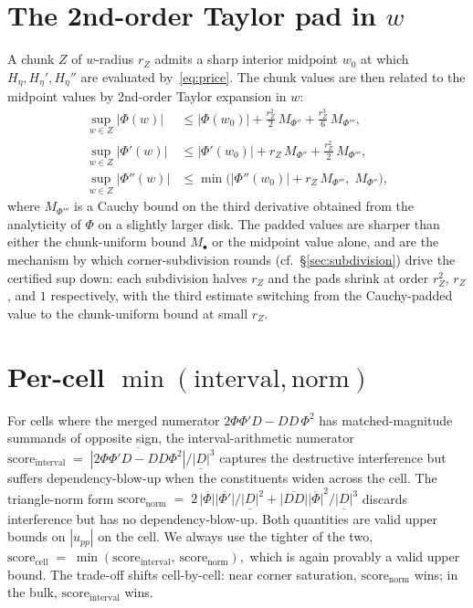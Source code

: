 \documentclass[11pt]{article}
\theoremstyle{definition}
\newcommand{\Heta}{H_{\eta}}
\newcommand{\HetaP}{H_{\eta}'}
\newcommand{\HetaPP}{H_{\eta}''}
\newcommand{\abslb}[1]{\underline{|#1|}}
\newcommand{\absub}[1]{\overline{|#1|}}
\begin{document}
\section{The 2nd-order Taylor pad in $w$}\label{sec:taylor-pad}

A chunk $Z$ of $w$-radius $r_Z$ admits a sharp interior midpoint $w_0$ at which
$\Heta, \HetaP, \HetaPP$ are evaluated by~\eqref{eq:price}. The chunk values are then
related to the midpoint values by 2nd-order Taylor expansion in $w$:
\begin{equation}\label{eq:taylor-pad}
\begin{aligned}
   \sup_{w\in Z}|\Phi(w)| &\le |\Phi(w_0)| + \tfrac{r_Z^2}{2}\,M_{\Phi''} + \tfrac{r_Z^3}{6}\,M_{\Phi'''}, \\
   \sup_{w\in Z}|\Phi'(w)| &\le |\Phi'(w_0)| + r_Z\,M_{\Phi''} + \tfrac{r_Z^2}{2}\,M_{\Phi'''}, \\
   \sup_{w\in Z}|\Phi''(w)| &\le \min\bigl(|\Phi''(w_0)| + r_Z\,M_{\Phi'''},\;M_{\Phi''}\bigr),
\end{aligned}
\end{equation}
where $M_{\Phi'''}$ is a Cauchy bound on the third derivative obtained from the
analyticity of $\Phi$ on a slightly larger disk. The padded values are sharper than
either the chunk-uniform bound $M_{\bullet}$ or the midpoint value alone, and are the
mechanism by which corner-subdivision rounds (cf.\ \S\ref{sec:subdivision}) drive the
certified sup down: each subdivision halves $r_Z$ and the pads shrink at order
$r_Z^2$, $r_Z$, and $1$ respectively, with the third estimate switching from the
Cauchy-padded value to the chunk-uniform bound at small $r_Z$.

\bigskip

\section{Per-cell $\min(\text{interval},\text{norm})$}\label{sec:min-cell}

For cells where the merged numerator $2\Phi\Phi'D - DD\,\Phi^2$ has matched-magnitude
summands of opposite sign, the interval-arithmetic numerator
\(
   \mathrm{score}_{\mathrm{interval}}
   \;=\;
   \absub{2\Phi\Phi'D - DD\Phi^2}\big/\abslb{D}^3
\)
captures the destructive interference but suffers dependency-blow-up when the
constituents widen across the cell. The triangle-norm form
\(
   \mathrm{score}_{\mathrm{norm}}
   \;=\;
   2\,\absub{\Phi}\absub{\Phi'}/\abslb{D}^2 + \absub{DD}\absub{\Phi}^2/\abslb{D}^3
\)
discards interference but has no dependency-blow-up. Both quantities are valid upper
bounds on $|u_{pp}|$ on the cell. We always use the tighter of the two,
\(
   \mathrm{score}_{\mathrm{cell}}
   \;=\;
   \min(\mathrm{score}_{\mathrm{interval}},\ \mathrm{score}_{\mathrm{norm}}),
\)
which is again provably a valid upper bound. The trade-off shifts cell-by-cell:
near corner saturation, $\mathrm{score}_{\mathrm{norm}}$ wins; in the bulk,
$\mathrm{score}_{\mathrm{interval}}$ wins.
\end{document}
